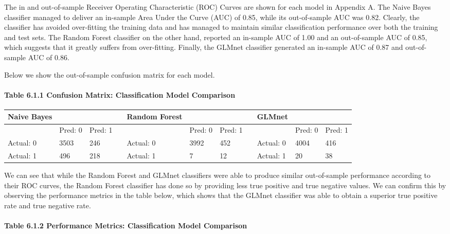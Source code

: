 \documentclass[]{article}
\let\oldparagraph\paragraph
\renewcommand{\paragraph}[1]{\oldparagraph{#1}\mbox{}}
\begin{document}
The in and out-of-sample Receiver Operating Characteristic (ROC) Curves
are shown for each model in Appendix A. The Naive Bayes classifier
managed to deliver an in-sample Area Under the Curve (AUC) of 0.85,
while its out-of-sample AUC was 0.82. Clearly, the classifier has
avoided over-fitting the training data and has managed to maintain
similar classification performance over both the training and test sets.
The Random Forest classifier on the other hand, reported an in-sample
AUC of 1.00 and an out-of-sample AUC of 0.85, which suggests that it
greatly suffers from over-fitting. Finally, the GLMnet classifier
generated an in-sample AUC of 0.87 and out-of-sample AUC of 0.86.

Below we show the out-of-sample confusion matrix for each model.

\paragraph{Table 6.1.1 Confusion Matrix: Classification Model
Comparison}\label{table-6.1.1-confusion-matrix-classification-model-comparison}

\begin{longtable}[]{@{}lllllllllll@{}}
\toprule
Naive Bayes & & & & Random Forest & & & & GLMnet & &\tabularnewline
\midrule
\endhead
& Pred: 0 & Pred: 1 & & & Pred: 0 & Pred: 1 & & & Pred: 0 & Pred:
1\tabularnewline
Actual: 0 & 3503 & 246 & & Actual: 0 & 3992 & 452 & & Actual: 0 & 4004 &
416\tabularnewline
Actual: 1 & 496 & 218 & & Actual: 1 & 7 & 12 & & Actual: 1 & 20 &
38\tabularnewline
\bottomrule
\end{longtable}

We can see that while the Random Forest and GLMnet classifiers were able
to produce similar out-of-sample performance according to their ROC
curves, the Random Forest classifier has done so by providing less true
positive and true negative values. We can confirm this by observing the
performance metrics in the table below, which shows that the GLMnet
classifier was able to obtain a superior true positive rate and true
negative rate.

\paragraph{Table 6.1.2 Performance Metrics: Classification Model
Comparison}\label{table-6.1.2-performance-metrics-classification-model-comparison}
\end{document}
